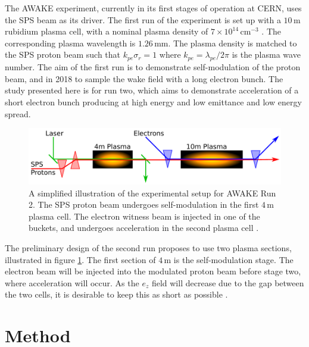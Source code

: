 \documentclass[aps,prstab,reprint,amsmath,amssymb,groupedaddress]{revtex4-1}
\newcommand{\unit}[1]{\,\mathrm{#1}}
\newcommand{\nexp}[1]{\times 10^{#1}}
\begin{document}
The AWAKE experiment, currently in its first stages of operation at CERN, uses the SPS beam as its driver. The first run
of the experiment is set up with a $10\unit{m}$ rubidium plasma cell, with a nominal plasma density of
$7\nexp{14}\unit{cm}^{-3}$ \cite{gschwendtner:2016}. The corresponding plasma wavelength is $1.26\unit{mm}$. The plasma
density is matched to the SPS proton beam such that $k_{pe}\sigma_{r} = 1$ where $k_{pe} = \lambda_{pe}/2\pi$ is the
plasma wave number. The aim of the first run is to demonstrate self-modulation of the proton beam, and in 2018 to
sample the wake field with a long electron bunch. The study presented here is for run two, which aims to demonstrate
acceleration of a short electron bunch producing at high energy and low emittance and low energy spread.

\begin{figure}[hbt]
    \includegraphics[width=0.99\linewidth,trim={1mm 2mm 1mm 2mm},clip]{figures/figAWAKE}
    \caption{\label{Fig:AWAKER2} A simplified illustration of the experimental setup for AWAKE Run 2. The SPS proton
        beam undergoes self-modulation in the first $4\unit{m}$ plasma cell. The electron witness beam is injected in
        one of the buckets, and undergoes acceleration in the second plasma cell \cite{berglyd_olsen:2015, adli:2016}.}
\end{figure}

The preliminary design of the second run proposes to use two plasma sections, illustrated in figure \ref{Fig:AWAKER2}.
The first section of $4\unit{m}$ is the self-modulation stage. The electron beam will be injected into the modulated
proton beam before stage two, where acceleration will occur. As the $e_z$ field will decrease due to the gap between the
two cells, it is desirable to keep this as short as possible \cite{adli:2016}.

\section[\label{S:M}]{Method}
\end{document}
